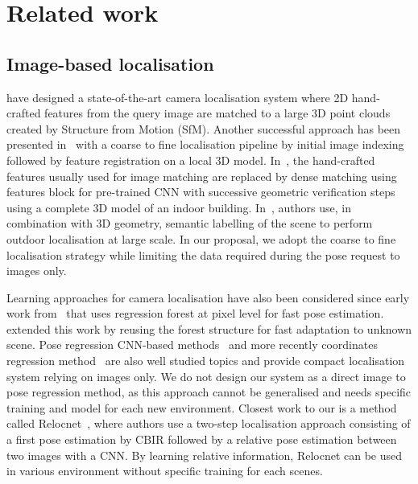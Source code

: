 \section{Related work}

\subsection{Image-based localisation}

\citet{Sattler2016a} have designed a state-of-the-art camera localisation system where 2D hand-crafted features from the query image are matched to a large 3D point clouds created by Structure from Motion (SfM). Another successful approach has been presented in~\citep{Sattler2017, Sattler2017a,Sarlin2018a, Sarlin2018} with a coarse to fine localisation pipeline by initial image indexing followed by feature registration on a local 3D model. In~\citep{Taira2018}, the hand-crafted features usually used for image matching are replaced by dense matching using features block for pre-trained CNN with successive geometric verification steps using a complete 3D model of an indoor building. In~\citep{Schonberger2017a}, authors use, in combination with 3D geometry, semantic labelling of the scene to perform outdoor localisation at large scale. In our proposal, we adopt the coarse to fine localisation strategy while limiting the data required during the pose request to images only.

Learning approaches for camera localisation have also been considered since early work from~\citep{Shotton2013} that uses regression forest at pixel level for fast pose estimation. \citet{Cavallari2018} extended this work by reusing the forest structure for fast adaptation to unknown scene. Pose regression CNN-based methods~\citep{Kendall2015, Kendall2016, Kendall2017a, Walch2016a, Saha2018} and more recently coordinates regression method~\citep{Brachmann2017,Brachmann2017b, Li2018} are also well studied topics and provide compact localisation system relying on images only. We do not design our system as a direct image to pose regression method, as this approach cannot be generalised and needs specific training and model for each new environment. Closest work to our is a method called Relocnet~\citep{Purkait2018}, where authors use a two-step localisation approach consisting of a first pose estimation by CBIR followed by a relative pose estimation between two images with a CNN. By learning relative information, Relocnet can be used in various environment without specific training for each scenes.

